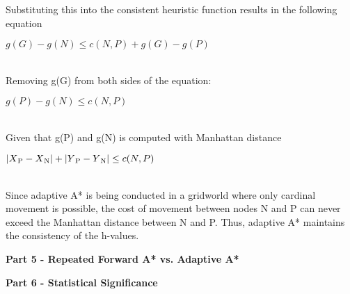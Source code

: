 \documentclass[11pt]{article}
\begin{document}
    Substituting this into the consistent heuristic function results in the following equation\\
    \centerline{$g(G) - g(N) \le c(N,P) + g(G) - g(P)$}\\
    
    Removing g(G) from both sides of the equation:\\
    \centerline{$g(P) - g(N) \le c(N,P)$}\\
    
    Given that g(P) and g(N) is computed with Manhattan distance\\
    \centerline{$|X\textsubscript{P}-X\textsubscript{N}| + |Y\textsubscript{P}-Y\textsubscript{N}| \le c(N, P)$}\\
    
    Since adaptive A* is being conducted in a gridworld where only cardinal movement is possible, the cost of movement between nodes N and P can never exceed the Manhattan distance between N and P. Thus, adaptive A* maintains the consistency of the h-values.
    
    \begin{center}
        \Large
        \textbf{Part 5 - Repeated Forward A* vs. Adaptive A*}
    \end{center}
    
    
    \begin{center}
        \Large
        \textbf{Part 6 - Statistical Significance}
    \end{center}
    
    
\end{document}
